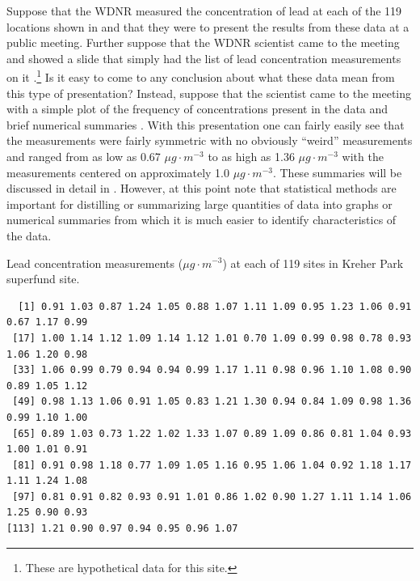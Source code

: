 \documentclass[10pt,openany]{book}\usepackage[]{graphicx}\usepackage[]{color}
\makeatletter
\newenvironment{kframe}{%
 \def\at@end@of@kframe{}%
 \ifinner\ifhmode%
  \def\at@end@of@kframe{\end{minipage}}%
  \begin{minipage}{\columnwidth}%
 \fi\fi%
 \def\FrameCommand##1{\hskip\@totalleftmargin \hskip-\fboxsep
 \colorbox{shadecolor}{##1}\hskip-\fboxsep
     \hskip-\linewidth \hskip-\@totalleftmargin \hskip\columnwidth}%
 \MakeFramed {\advance\hsize-\width
   \@totalleftmargin\z@ \linewidth\hsize
   \@setminipage}}%
 {\par\unskip\endMakeFramed%
 \at@end@of@kframe}
\newenvironment{knitrout}{}{} %
\makeatother
\begin{document}
Suppose that the WDNR measured the concentration of lead at each of the 119 locations shown in  and that they were to present the results from these data at a public meeting.  Further suppose that the WDNR scientist came to the meeting and showed a slide that simply had the list of lead concentration measurements on it .\footnote{These are hypothetical data for this site.}  Is it easy to come to any conclusion about what these data mean from this type of presentation?  Instead, suppose that the scientist came to the meeting with a simple plot of the frequency of concentrations present in the data and brief numerical summaries .  With this presentation one can fairly easily see that the measurements were fairly symmetric with no obviously ``weird'' measurements and ranged from as low as 0.67 $\mu g \cdot m^{-3}$ to as high as 1.36 $\mu g \cdot m^{-3}$ with the measurements centered on approximately 1.0 $\mu g \cdot m^{-3}$.  These summaries will be discussed in detail in .  However, at this point note that statistical methods are important for distilling or summarizing large quantities of data into graphs or numerical summaries from which it is much easier to identify characteristics of the data.

\begin{table}[htbp]   \label{tab:KreherParkPbconc}
  \caption{Lead concentration measurements ($\mu g \cdot m^{-3}$) at each of 119 sites in Kreher Park superfund site.}
  \begin{center}
\begin{knitrout}
\color{fgcolor}\begin{kframe}
\begin{verbatim}
  [1] 0.91 1.03 0.87 1.24 1.05 0.88 1.07 1.11 1.09 0.95 1.23 1.06 0.91 0.67 1.17 0.99
 [17] 1.00 1.14 1.12 1.09 1.14 1.12 1.01 0.70 1.09 0.99 0.98 0.78 0.93 1.06 1.20 0.98
 [33] 1.06 0.99 0.79 0.94 0.94 0.99 1.17 1.11 0.98 0.96 1.10 1.08 0.90 0.89 1.05 1.12
 [49] 0.98 1.13 1.06 0.91 1.05 0.83 1.21 1.30 0.94 0.84 1.09 0.98 1.36 0.99 1.10 1.00
 [65] 0.89 1.03 0.73 1.22 1.02 1.33 1.07 0.89 1.09 0.86 0.81 1.04 0.93 1.00 1.01 0.91
 [81] 0.91 0.98 1.18 0.77 1.09 1.05 1.16 0.95 1.06 1.04 0.92 1.18 1.17 1.11 1.24 1.08
 [97] 0.81 0.91 0.82 0.93 0.91 1.01 0.86 1.02 0.90 1.27 1.11 1.14 1.06 1.25 0.90 0.93
[113] 1.21 0.90 0.97 0.94 0.95 0.96 1.07
\end{verbatim}
\end{kframe}
\end{knitrout}
  \end{center}
\end{table}
\end{document}
